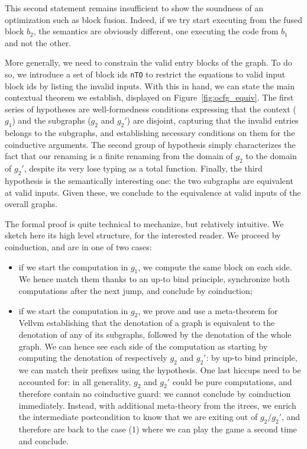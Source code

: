 \documentclass[11pt]{article}
\newcommand{\inlinecoq}[1]{\mbox{\lstinline[style=customcoq,columns=fixed,basewidth=.48em]{#1}}}
\newcommand{\ilc}[1]{\inlinecoq{#1}}
\begin{document}
This second statement remains insufficient to show the soundness of an optimization such as block fusion. Indeed, if we try start executing from the fused block $b_2$, the semantics are obviously different, one executing the code from $b_1$ and not the other.

More generally, we need to constrain the valid entry blocks of the graph. 
To do so, we introduce a set of block ids \ilc{nTO} to restrict the equations to valid input block ids by listing the invalid inputs.
With this in hand, we can state the main contextual theorem we establish, displayed on Figure~\ref{fig:ocfg_equiv}.
The first series of hypotheses are well-formedness conditions expressing that the context ($g_1$) and the subgraphs ($g_2$ and $g_2'$) are disjoint,
capturing that the invalid entries belongs to the subgraphs,
and establishing necessary conditions on them for the coinductive arguments.
The second group of hypothesis simply characterizes the fact that our renaming is a finite renaming from the domain of $g_2$ to the domain of $g_2'$, despite its very lose typing as a total function.
Finally, the third hypothesis is the semantically interesting one: the two subgraphs are equivalent at valid inputs.
Given these, we conclude to the equivalence at valid inputs of the overall graphs.

The formal proof is quite technical to mechanize, but relatively intuitive. We sketch here its high level structure, for the interested reader. We proceed by coinduction, and are in one of two cases:
\begin{itemize}
\item if we start the computation in $g_1$, we compute the same block on each side. We hence match them thanks to an up-to bind principle, synchronize both computations after the next jump, and conclude by coinduction;
\item if we start the computation in $g_2$, we prove and use a meta-theorem for Vellvm establishing that the denotation of a graph is equivalent to the denotation of any of its subgraphs, followed by the denotation of the whole graph. We can hence see each side of the computation as starting by computing the denotation of respectively $g_2$ and $g_2'$: by up-to bind principle, we can match their prefixes using the hypothesis. One last hiccups need to be accounted for: in all generality, $g_2$ and $g_2'$ could be pure computations, and therefore contain no coinductive guard: we cannot conclude by coinduction immediately.
Instead, with additional meta-theory from the itrees, we enrich the intermediate postcondition to know that we are exiting out of $g_2/g_2'$, and therefore are back to the case (1) where we can play the game a second time and conclude.
\end{itemize}
\end{document}
